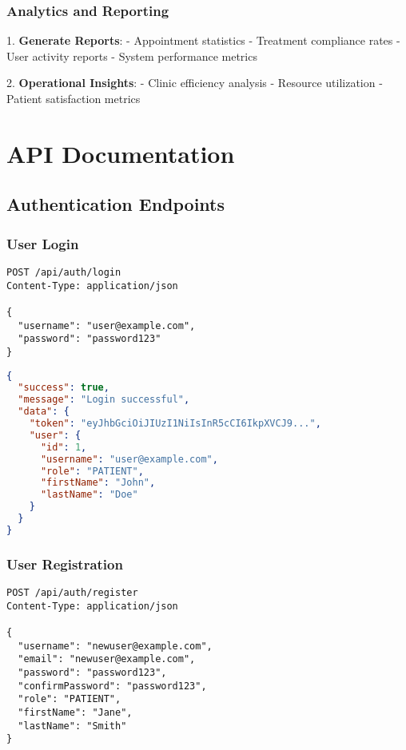 \documentclass[12pt,a4paper]{article}
\begin{document}
\subsubsection{Analytics and Reporting}

1. \textbf{Generate Reports}:
   - Appointment statistics
   - Treatment compliance rates
   - User activity reports
   - System performance metrics

2. \textbf{Operational Insights}:
   - Clinic efficiency analysis
   - Resource utilization
   - Patient satisfaction metrics

\section{API Documentation}

\subsection{Authentication Endpoints}

\subsubsection{User Login}

\begin{lstlisting}[language=HTTP, caption=Login Request]
POST /api/auth/login
Content-Type: application/json

{
  "username": "user@example.com",
  "password": "password123"
}
\end{lstlisting}

\begin{lstlisting}[language=JSON, caption=Login Response]
{
  "success": true,
  "message": "Login successful",
  "data": {
    "token": "eyJhbGciOiJIUzI1NiIsInR5cCI6IkpXVCJ9...",
    "user": {
      "id": 1,
      "username": "user@example.com",
      "role": "PATIENT",
      "firstName": "John",
      "lastName": "Doe"
    }
  }
}
\end{lstlisting}

\subsubsection{User Registration}

\begin{lstlisting}[language=HTTP, caption=Registration Request]
POST /api/auth/register
Content-Type: application/json

{
  "username": "newuser@example.com",
  "email": "newuser@example.com",
  "password": "password123",
  "confirmPassword": "password123",
  "role": "PATIENT",
  "firstName": "Jane",
  "lastName": "Smith"
}
\end{lstlisting}
\end{document}
